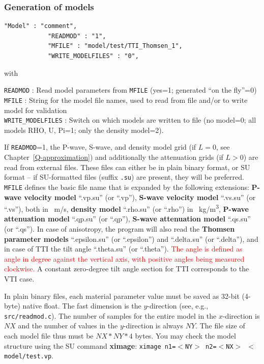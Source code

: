 \subsubsection{Generation of models}
\label{gen_of_mod}
\begin{verbatim}
"Model" : "comment",
            "READMOD" : "1",
            "MFILE" : "model/test/TTI_Thomsen_1",
            "WRITE_MODELFILES" : "0",
\end{verbatim}

with

\texttt{READMOD} : Read model parameters from \texttt{MFILE} (yes=1; generated \enquote{on the fly}=0)\\
\texttt{MFILE} : String for the model file names, used to read from file and/or to write model for validation\\
\texttt{WRITE\_MODELFILES} : Switch on which models are written to file (no model=0; all models RHO, U, Pi=1; only the density model=2).

If \texttt{READMOD}=1, the P-wave, S-wave, and density model grid (if $L=0$, see Chapter~\ref{Q-approximation}) and additionally the attenuation grids (if $L>0$) are read from external files. These files can either be in plain binary format, or SU format -- if SU-formatted files (suffix \texttt{.su}) are present, they will be preferred. \texttt{MFILE} defines the basic file name that is expanded by the following extensions: \textbf{P-wave velocity model} \enquote{.vp.su} (or \enquote{.vp}), \textbf{S-wave velocity model} \enquote{.vs.su} (or \enquote{.vs}), both in \SI{}{m/s}, \textbf{density model} \enquote{.rho.su} (or \enquote{.rho}) in \SI{}{kg/m^3}, \textbf{P-wave attenuation model} \enquote{.qp.su} (or \enquote{.qp}), \textbf{S-wave attenuation model} \enquote{.qs.su} (or \enquote{.qs}). In case of anisotropy, the program will also read the \textbf{Thomsen parameter models} \enquote{.epsilon.su} (or \enquote{.epsilon}) and \enquote{.delta.su} (or \enquote{.delta}), and in case of TTI the tilt angle \enquote{.theta.su} (or \enquote{.theta}). \textcolor{red}{The angle is defined as angle in degree against the vertical axis, with positive angles being measured clockwise.} A constant zero-degree tilt angle section for TTI corresponds to the VTI case.

In plain binary files, each material parameter value must be saved as 32-bit (4-byte) native float. The fast dimension is the $y$-direction (see, e.g., \texttt{src/readmod.c}). The number of samples for the entire model in the $x$-direction is $NX$ and the number of values in the $y$-direction is always $NY$. The file size of each model file thus must be $NX*NY*4$ bytes. You may check the model structure using the SU command \textbf{ximage}: \texttt{ximage n1=$<$NY$>$ n2=$<$NX$>$ $<$ model/test.vp}.

